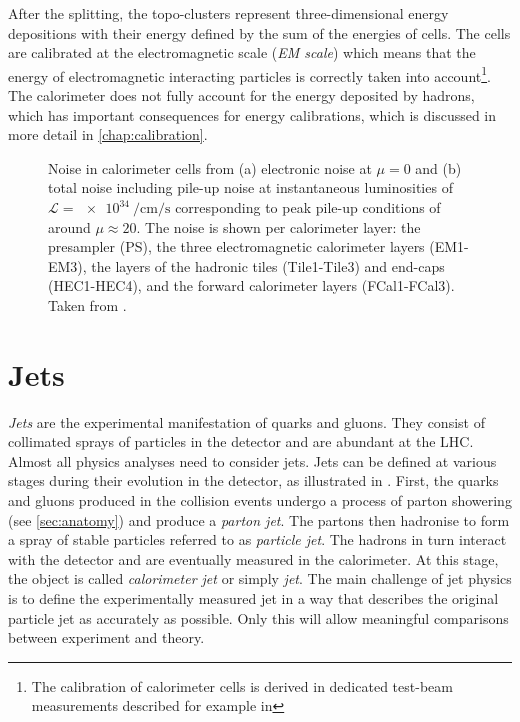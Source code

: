 After the splitting, the topo-clusters represent three-dimensional energy depositions with their energy defined by the sum of the energies of cells.
The cells are calibrated at the electromagnetic scale (\emph{EM scale}) which means that the energy of electromagnetic interacting particles is correctly taken into account\footnote{The calibration of calorimeter cells is derived in dedicated test-beam measurements described for example in }. The calorimeter does not fully account for the energy deposited by hadrons, which has important consequences for energy calibrations, which is discussed in more detail in \cref{chap:calibration}.

\begin{figure}
        
    \caption{Noise in calorimeter cells from (a) electronic noise at $\mu=0$ and (b) total noise including pile-up noise at instantaneous luminosities of $\mathcal{L} = \SI{e34}{\per\cm\per\s}$ corresponding to peak pile-up conditions of around $\mu\approx20$. The noise is shown per calorimeter layer: the presampler (PS), the three electromagnetic calorimeter layers (EM1-EM3), the layers of the hadronic tiles (Tile1-Tile3) and end-caps (HEC1-HEC4), and the forward calorimeter layers (FCal1-FCal3). Taken from .}
    \label{fig:calo-noise}
\end{figure}


\section{Jets}
\emph{Jets} are the experimental manifestation of quarks and gluons.
They consist of collimated sprays of particles in the detector and are abundant at the LHC.
Almost all physics analyses need to consider jets. Jets can be defined at various stages during their evolution in the detector, as illustrated in . First, the quarks and gluons produced in the collision events undergo a process of parton showering (see \cref{sec:anatomy}) and produce a \emph{parton jet}. The partons then hadronise to form a spray of stable particles referred to as \emph{particle jet}. The hadrons in turn interact with the detector and are eventually measured in the calorimeter. At this stage, the object is called \emph{calorimeter jet} or simply \emph{jet}.
The main challenge of jet physics is to define the experimentally measured jet in a way that describes the original particle jet as accurately as possible.
Only this will allow meaningful comparisons between experiment and theory.

